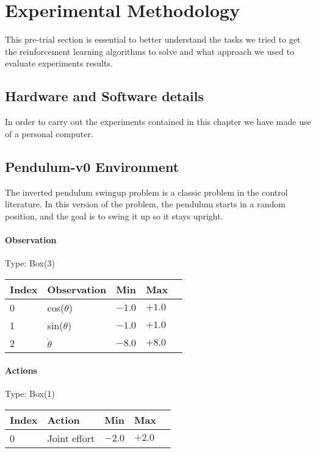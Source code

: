 \section{Experimental Methodology}

This pre-trial section is essential to better understand the tasks we tried to get the reinforcement learning algorithms to solve and what approach we used to evaluate experiments results.

\subsection{Hardware and Software details}

In order to carry out the experiments contained in this chapter we have made use of a personal computer.

\subsection{Pendulum-v0 Environment}

The inverted pendulum swingup problem is a classic problem in the control literature. In this version of the problem, the pendulum starts in a random position, and the goal is to swing it up so it stays upright.
	\paragraph{Observation}
	Type: Box(3)
	\begin{table}[!h]
		\centering
		\label{mountain_observation}
		\begin{tabular}{@{}lllll@{}}
			\toprule
			Index	& Observation		& Min 		& Max 		\\ \midrule
			0			& cos($\theta$)	 	&  $-1.0$	& $+1.0$ 	\\
			1			& sin($\theta$)	 	&  $-1.0$		& $+1.0$ \\
			2			& $\dot{\theta}$	 	&  $-8.0$		& $+8.0$ \\
			\bottomrule
		\end{tabular}
	\end{table}
	\paragraph{Actions}
	Type: Box(1)
	\begin{table}[!h]
		\centering
		\label{mountain_action}
		\begin{tabular}{@{}lllll@{}}
			\toprule
			Index	& Action	& Min 		& Max 		\\ \midrule
			0			& Joint effort &  $-2.0$	& $+2.0$ 	\\
			\bottomrule
		\end{tabular}
	\end{table}
	
